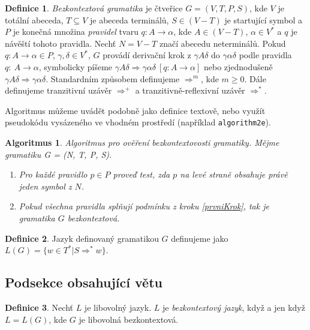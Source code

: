 \documentclass[11pt, a4paper, twocolumn]{article}
\theoremstyle{definition}
\newtheorem{definice}{Definice}[section]
\theoremstyle{plain}
\newtheorem{algoritmus}{Algoritmus}[section]
\begin{document}
	\begin{definice} \label{def_bezkontextova_gramatika}
	\emph{Bezkontextová gramatika} je čtveřice $G=(V,T,P,S)$, kde $V$ je totální abeceda,
	$T \subseteq V$ je abeceda terminálů, $S \in (V-T)$ je startující symbol a $P$ je konečná množina \emph{pravidel} tvaru $q: A \rightarrow \alpha$, kde $A \in (V - T)$, $\alpha \in V^*$ a $q$ je návěští tohoto pravidla. Nechť $N = V - T$ značí abecedu neterminálů.
	Pokud $q\!: A \rightarrow \alpha \in P$, $\gamma,\delta \in V^*$, $G$ provádí derivační krok z $\gamma A \delta$ do $\gamma \alpha \delta$ podle pravidla $q\!:\ A \rightarrow \alpha$, symbolicky píšeme $\gamma A \delta \Rightarrow \gamma \alpha \delta\ [q\!: A \rightarrow \alpha]$ nebo zjednodušeně $\gamma A \delta \Rightarrow \gamma \alpha \delta$. Standardním způsobem definujeme $\Rightarrow^m$, kde $m \geq 0$. Dále definujeme tranzitivní uzávěr $\Rightarrow^+$ a tranzitivně-reflexivní uzávěr $\Rightarrow^*$.
	\end{definice}

	Algoritmus můžeme uvádět podobně jako definice textově, nebo využít pseudokódu vysázeného ve vhodném prostředí (například \texttt{algorithm2e}).

	\begin{algoritmus}
	Algoritmus pro ověření bezkontextovosti gramatiky. Mějme gramatiku G = (N, T, P, S).
		\begin{enumerate}
	 		\item \label{prvniKrok} Pro každé pravidlo $p \in P$ proveď test, zda $p$ na levé straně obsahuje právě jeden symbol z $N$.
	 		\item Pokud všechna pravidla splňují podmínku z kroku \ref{prvniKrok}, tak je gramatika $G$ bezkontextová.
	 	\end{enumerate}
	\end{algoritmus}

	\begin{definice}
	Jazyk definovaný gramatikou $G$ definujeme jako $L(G) = \{w \in T^*|S \Rightarrow^* w\}$.
	\end{definice}

	\subsection{Podsekce obsahující větu}

	\begin{definice}
	Nechť $L$ je libovolný jazyk. $L$ je \emph{bezkontextový jazyk}, když a jen když $L = L(G)$, kde $G$ je libovolná bezkontextová.
	\end{definice}
\end{document}
